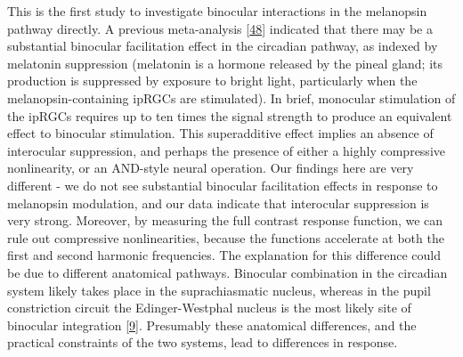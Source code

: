 \documentclass[
]{article}
\begin{document}
This is the first study to investigate binocular interactions in the melanopsin pathway directly. A previous meta-analysis {[}\protect\hyperlink{ref-Spitschan2019}{48}{]} indicated that there may be a substantial binocular facilitation effect in the circadian pathway, as indexed by melatonin suppression (melatonin is a hormone released by the pineal gland; its production is suppressed by exposure to bright light, particularly when the melanopsin-containing ipRGCs are stimulated). In brief, monocular stimulation of the ipRGCs requires up to ten times the signal strength to produce an equivalent effect to binocular stimulation. This superadditive effect implies an absence of interocular suppression, and perhaps the presence of either a highly compressive nonlinearity, or an AND-style neural operation. Our findings here are very different - we do not see substantial binocular facilitation effects in response to melanopsin modulation, and our data indicate that interocular suppression is very strong. Moreover, by measuring the full contrast response function, we can rule out compressive nonlinearities, because the functions accelerate at both the first and second harmonic frequencies. The explanation for this difference could be due to different anatomical pathways. Binocular combination in the circadian system likely takes place in the suprachiasmatic nucleus, whereas in the pupil constriction circuit the Edinger-Westphal nucleus is the most likely site of binocular integration {[}\protect\hyperlink{ref-Mathot2018}{9}{]}. Presumably these anatomical differences, and the practical constraints of the two systems, lead to differences in response.
\end{document}
